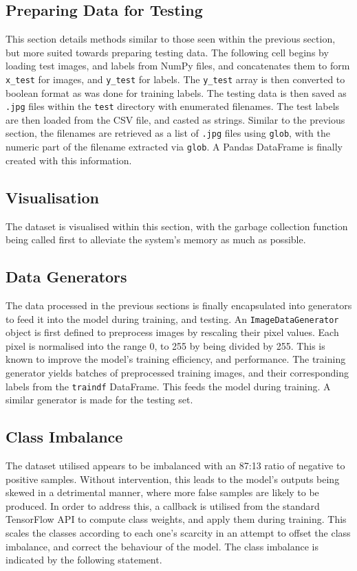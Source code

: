 \documentclass[../main]{subfiles}
\begin{document}
\subsection{Preparing Data for Testing}
This section details methods similar to those seen within the previous section,
but more suited towards preparing testing data. The following cell begins by
loading test images, and labels from NumPy files, and concatenates them to form
\texttt{x\_test} for images, and \texttt{y\_test} for labels. The
\texttt{y\_test} array is then converted to boolean format as was done for
training labels. The testing data is then saved as \texttt{.jpg} files within
the \texttt{test} directory with enumerated filenames. The test labels are then
loaded from the CSV file, and casted as strings. Similar to the previous
section, the filenames are retrieved as a list of \texttt{.jpg} files using
\texttt{glob}, with the numeric part of the filename extracted via
\texttt{glob}. A Pandas DataFrame is finally created with this information.

\subsection{Visualisation}
The dataset is visualised within this section, with the garbage
collection function being called first to alleviate the system's memory
as much as possible.
   
\subsection{Data Generators}
The data processed in the previous sections is finally encapsulated into
generators to feed it into the model during training, and testing. An
\texttt{ImageDataGenerator} object is first defined to preprocess images by
rescaling their pixel values. Each pixel is normalised into the range 0, to
255 by being divided by 255. This is known to improve the model's training
efficiency, and performance. The training generator yields batches of
preprocessed training images, and their corresponding labels from the
\texttt{traindf} DataFrame. This feeds the model during training. A similar
generator is made for the testing set.

\subsection{Class Imbalance} The dataset utilised appears to be imbalanced with
an 87:13 ratio of negative to positive samples. Without intervention, this leads
to the model's outputs being skewed in a detrimental manner, where more false
samples are likely to be produced. In order to address this, a callback is
utilised from the standard TensorFlow API to compute class weights, and apply
them during training. This scales the classes according to each one's scarcity
in an attempt to offset the class imbalance, and correct the behaviour of the
model. The class imbalance is indicated by the following statement.
\end{document}
